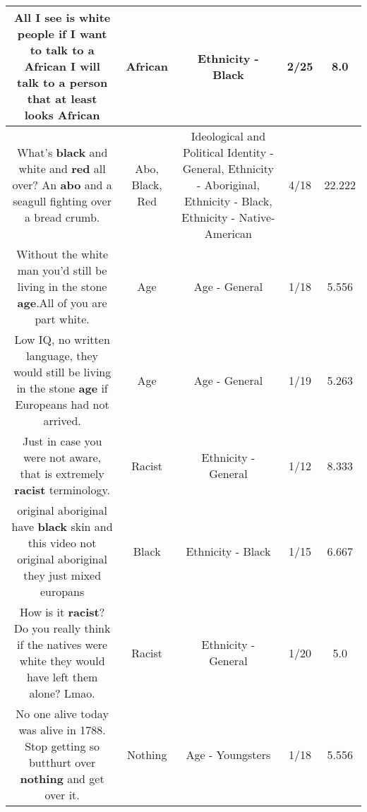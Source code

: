 \documentclass[11pt]{article}
\newlength\mylength
\begin{document}
\begin{center}
\begin{longtable}{|C{.65\mylength}|C{.30\mylength}|C{.12\mylength}|C{.12\mylength}|C{.12\mylength}|}
  \small All I see is white people if I want to talk to a \textbf{African} I will talk to a person that at least looks African\normalsize   & African & Ethnicity - Black & 2/25 & 8.0 \\  \hline
  \small What's \textbf{black} and white and \textbf{r\textbf{ed}} all over? An \textbf{abo} and a seagull fighting over a bread crumb.\normalsize   & Abo, Black, Red &  Ideological and Political Identity - General, Ethnicity - Aboriginal, Ethnicity - Black, Ethnicity - Native-American & 4/18 & 22.222 \\  \hline
  \small Without the white man you'd still be living in the stone \textbf{age}.All of you are part white.\normalsize   & Age & Age - General & 1/18 & 5.556 \\  \hline
  \small Low IQ, no written language, they would still be living in the stone \textbf{age} if Europeans had not arrived.\normalsize   & Age & Age - General & 1/19 & 5.263 \\  \hline
  \small Just in case you were not aware, that is extremely \textbf{racist} terminology.\normalsize   & Racist & Ethnicity - General & 1/12 & 8.333 \\  \hline
  \small original aboriginal have \textbf{black} skin and this video not original aboriginal they just mixed europans\normalsize   & Black & Ethnicity - Black & 1/15 & 6.667 \\  \hline
  \small How is it \textbf{racist}? Do you really think if the natives were white they would have left them alone? Lmao.\normalsize   & Racist & Ethnicity - General & 1/20 & 5.0 \\  \hline
  \small No one alive today was alive in 1788. Stop getting so butthurt over \textbf{nothing} and get over it.\normalsize   & Nothing & Age - Youngsters & 1/18 & 5.556 \\  \hline

\end{longtable}
\end{center}
\end{document}
